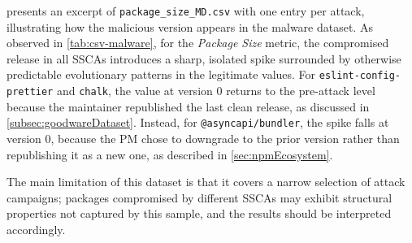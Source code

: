  presents an excerpt of \texttt{package\_size\_MD.csv} with one entry per attack, 
illustrating how the malicious version appears in the malware dataset.
As observed in \cref{tab:csv-malware}, for the \emph{Package Size} metric, 
the compromised release in all \acp{SSCA} introduces a sharp, 
isolated spike surrounded by otherwise predictable evolutionary patterns in the legitimate values.
For \texttt{eslint-config-prettier} and \texttt{chalk}, the value at version 0 returns to the pre-attack level 
because the maintainer republished the last clean release, as discussed in \cref{subsec:goodwareDataset}.
Instead, for \texttt{@asyncapi/bundler}, the spike falls at version 0, 
because the \ac{PM} chose to downgrade to the prior version rather than republishing it as a new one, as described in \cref{sec:npmEcosystem}.

The main limitation of this dataset is that it covers a narrow selection of attack campaigns;
packages compromised by different \acp{SSCA} may exhibit structural properties not captured by this sample,
and the results should be interpreted accordingly.
